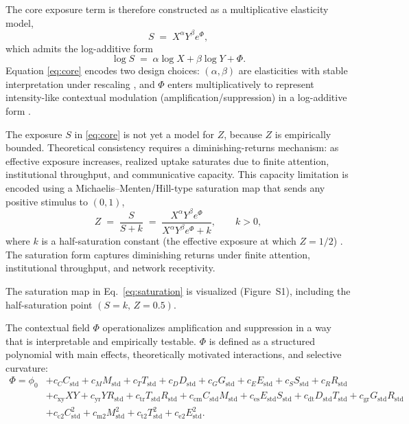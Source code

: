 \documentclass[11pt]{article}
\begin{document}
The core exposure term is therefore constructed as a multiplicative elasticity model,
\begin{equation}
\label{eq:core}
S \;=\; X^{\alpha} Y^{\beta} e^{\Phi},
\end{equation}
which admits the log-additive form
\begin{equation}
\label{eq:core_log}
\log S \;=\; \alpha \log X + \beta \log Y + \Phi .
\end{equation}
Equation \eqref{eq:core} encodes two design choices: $(\alpha,\beta)$ are elasticities with stable interpretation under rescaling \parencite{Greene2018Econometric}, and $\Phi$ enters multiplicatively to represent intensity-like contextual modulation (amplification/suppression) in a log-additive form \parencite{Cox1972}.

The exposure $S$ in \eqref{eq:core} is not yet a model for $Z$, because $Z$ is empirically bounded. Theoretical consistency requires a diminishing-returns mechanism: as effective exposure increases, realized uptake saturates due to finite attention, institutional throughput, and communicative capacity. This capacity limitation is encoded using a Michaelis--Menten/Hill-type saturation map that sends any positive stimulus to $(0,1)$,
\begin{equation}
\label{eq:saturation}
Z \;=\; \frac{S}{S+k}
\;=\; \frac{X^{\alpha} Y^{\beta} e^{\Phi}}{X^{\alpha} Y^{\beta} e^{\Phi}+k},
\qquad k>0,
\end{equation}
where $k$ is a half-saturation constant (the effective exposure at which $Z=1/2$) \parencite{MichaelisMenten1913,BriggsHaldane1925,Hill1910,Weiss1997}. The saturation form captures diminishing returns under finite attention, institutional throughput, and network receptivity.

The saturation map in Eq.~\eqref{eq:saturation} is visualized (Figure~S1), including the half-saturation point $(S=k,\,Z=0.5)$.

The contextual field $\Phi$ operationalizes amplification and suppression in a way that is interpretable and empirically testable. $\Phi$ is defined as a structured polynomial with main effects, theoretically motivated interactions, and selective curvature:
\begin{equation}
\label{eq:phi}
\begin{aligned}
\Phi=\phi_0
&+ c_C C_{\mathrm{std}} + c_M M_{\mathrm{std}} + c_T T_{\mathrm{std}} + c_D D_{\mathrm{std}}
+ c_G G_{\mathrm{std}} + c_E E_{\mathrm{std}} + c_S S_{\mathrm{std}} + c_R R_{\mathrm{std}} \\
&+ c_{\mathrm{xy}} X Y
+ c_{\mathrm{yr}} Y R_{\mathrm{std}}
+ c_{\mathrm{tr}} T_{\mathrm{std}} R_{\mathrm{std}}
+ c_{\mathrm{cm}} C_{\mathrm{std}} M_{\mathrm{std}}
+ c_{\mathrm{es}} E_{\mathrm{std}} S_{\mathrm{std}}
+ c_{\mathrm{dt}} D_{\mathrm{std}} T_{\mathrm{std}}
+ c_{\mathrm{gr}} G_{\mathrm{std}} R_{\mathrm{std}} \\
&+ c_{\mathrm{c2}} C_{\mathrm{std}}^{2} + c_{\mathrm{m2}} M_{\mathrm{std}}^{2}
+ c_{\mathrm{t2}} T_{\mathrm{std}}^{2} + c_{\mathrm{e2}} E_{\mathrm{std}}^{2}.
\end{aligned}
\end{equation}
\end{document}
